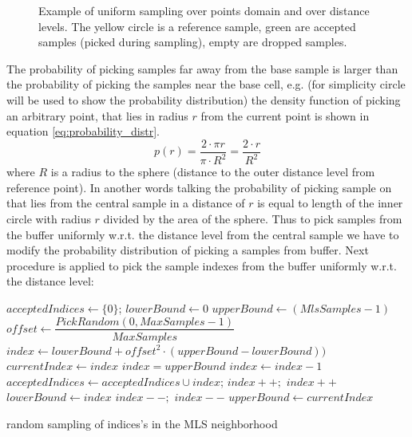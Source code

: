 \begin{figure}
\begin{center}
	\end{center}
	\caption{Example of uniform sampling over points domain and over distance levels. The yellow circle is a reference sample, green are accepted samples (picked during sampling), empty are dropped samples.}
	\label{fig:samples_distribution}
\end{figure}

The probability of picking samples far away from the base sample is larger than the probability of picking the samples near the base cell, e.g. (for simplicity circle will be used to show the probability distribution) the density function of picking an arbitrary point, that lies in radius $r$ from the current point is shown in equation \ref{eq:probability_distr}.
\begin{equation}
	p(r) = \dfrac{2 \cdot \pi r}{\pi \cdot R^2} = \dfrac{2 \cdot r}{R^2}
	\label{eq:probability_distr}
\end{equation}
where $R$ is a radius to the sphere (distance to the outer distance level from reference point). In another words talking the probability of picking sample on that lies from the central sample in a distance of $r$ is equal to length of the inner circle with radius $r$ divided by the area of the sphere.
Thus to pick samples from the buffer uniformly w.r.t. the distance level from the central sample we have to modify the probability distribution of picking a samples from buffer. Next procedure is applied to pick the sample indexes from the buffer uniformly w.r.t. the distance level:
\begin{algorithm}[H]
	\scriptsize
	\begin{algorithmic}
			\State $acceptedIndices \gets \{0\}$;
			\State $lowerBound \gets 0$
			\State $upperBound \gets (MlsSamples - 1)$
				\State $offset \gets \dfrac{PickRandom(0, MaxSamples - 1)}{MaxSamples}$
				\State $index \gets lowerBound + offset^2 \cdot (upperBound - lowerBound))$
				\State $currentIndex \gets index$
						\State $index = upperBound$
					\Else
						\State $index \gets index - 1$
					\EndIf
				\EndWhile
				\State $acceptedIndices \gets acceptedIndices \cup index$;
					\State $index++;$
						\State $index++$
					\EndWhile
					\State $lowerBound \gets index$
				\Else 
						\State $index--;$
							\State $index--$
						\EndWhile
						\State $upperBound \gets currentIndex$
					\EndIf
				\EndIf
			\EndFor
	\end{algorithmic}
	\caption{random sampling of indices's in the MLS neighborhood}
	\label{alg:mls_montecarlo_sampling}
\end{algorithm}
